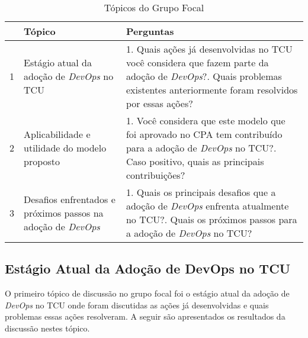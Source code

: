\begin{table}[hb!]
\centering
\caption{Tópicos do Grupo Focal}
\label{tabela_topicos}
\begin{tabular}{|p{0.3cm}|p{6.4cm}|p{7cm}|} \hline
& \textbf{Tópico} & \textbf{Perguntas} \\ \hline

1 & Estágio atual da adoção de {\it DevOps} no \acrshort{TCU} &
1. Quais ações já desenvolvidas no \acrshort{TCU} você considera que fazem parte da adoção de {\it DevOps}?\newline\newline
2. Quais problemas existentes anteriormente foram resolvidos por essas ações? \\ \hline

2 & Aplicabilidade e utilidade do modelo proposto &
1. Você considera que este modelo que foi aprovado no \acrshort{CPA} tem contribuído para a adoção de {\it DevOps} no \acrshort{TCU}?\newline\newline
2. Caso positivo, quais as principais contribuições? \\ \hline

3 & Desafios enfrentados e próximos passos na adoção de {\it DevOps} &
1. Quais os principais desafios que a adoção de {\it DevOps} enfrenta atualmente no \acrshort{TCU}?\newline\newline
2. Quais os próximos passos para a adoção de {\it DevOps} no \acrshort{TCU}?\\ \hline

\end{tabular}
\end{table}

\subsection{Estágio Atual da Adoção de DevOps no TCU}

O primeiro tópico de discussão no grupo focal foi o estágio atual da adoção de
{\it DevOps} no \acrshort{TCU} onde foram discutidas as ações já desenvolvidas
e quais problemas essas ações resolveram. A seguir são apresentados os
resultados da discussão nestes tópico.

